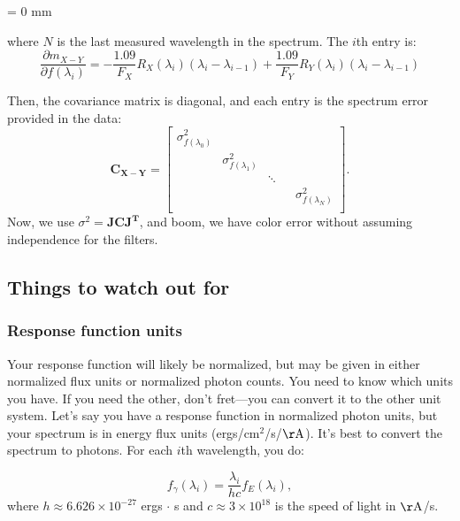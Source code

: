 \parindent = 0 mm

where $N$ is the last measured wavelength in the spectrum. The $i$th entry is: 
\begin{equation}
    \frac{\partial m_{X-Y}}{\partial f(\lambda_{i})} = -\frac{1.09}{F_{X}} R_{X}(\lambda_{i})(\lambda_{i}-\lambda_{i-1}) + \frac{1.09}{F_{Y}}R_{Y}(\lambda_{i})(\lambda_{i}-\lambda_{i-1})
\end{equation}

Then, the covariance matrix is diagonal, and each entry is the spectrum error provided in the data:
\begin{equation}\mathbf{C_{X-Y}} = 
    \begin{bmatrix}
        \sigma_{f(\lambda_{0})}^{2} &  & & \\
         & \sigma_{f(\lambda_{1})}^{2}&  & \\
         &  & \ddots &  \\
        & & & & \sigma_{f(\lambda_{N})}^{2}\\
    \end{bmatrix}.
    \label{eqn:cov}
\end{equation}
Now, we use $\sigma^{2} = \mathbf{JCJ^{T}}$, and boom, we have color error without assuming independence for the filters. 

\subsection{Things to watch out for}
\subsubsection{Response function units}
Your response function will likely be normalized, but may be given in either normalized flux units or normalized photon counts. You need to know which units you have. If you need the other, don't fret---you can convert it to the other unit system. Let's say you have a response function in normalized photon units, but your spectrum is in energy flux units (ergs/cm$^{2}$/s/$\mathrm{\AA}$). It's best to convert the spectrum to photons. For each $i$th wavelength, you do:

\begin{equation}
    f_{\gamma}(\lambda_{i}) = \frac{\lambda_{i}}{hc}f_{E}(\lambda_{i}),
\end{equation}
where $h \approx 6.626 \times 10^{-27}$ ergs $\cdot$ s and $c \approx 3\times 10^{18}$ is the speed of light in $\mathrm{\AA}$/s. 

